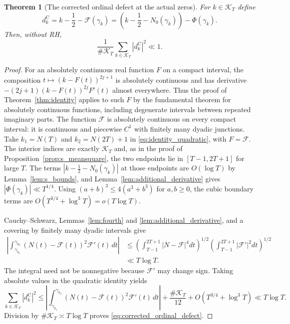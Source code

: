 \documentclass[11pt,a4paper]{article}
\makeatletter
\numberwithin{equation}{section}
\DeclareRobustCommand{\CGref}[1]{\ref{#1}}
\DeclareRobustCommand{\CGeqref}[1]{\eqref{#1}}
\let\CG@origref\ref
\let\CG@origeqref\eqref
\newcommand{\CG@gettip}[1]{\@ifundefined{CGTip@#1}{#1}{\csname CGTip@#1\endcsname}}
\DeclareRobustCommand{\CGref}[1]{\pdftooltip{\CG@origref{#1}}{\CG@gettip{#1}}}
\DeclareRobustCommand{\CGeqref}[1]{\pdftooltip{\CG@origeqref{#1}}{\CG@gettip{#1}}}
\newtheorem{theorem}{Theorem}[section]
\theoremstyle{definition}
\theoremstyle{remark}
\newcommand{\Nz}{N_0} %
\newcommand{\Fc}{\mathcal F}
\newcommand{\Ph}{\Phi}
\makeatother
\begin{document}
\begin{theorem}[The corrected ordinal defect at the actual zeros]\label{thm:corrected_ordinal_defect}
For $k\in\mathcal K_T$ define
\begin{equation}
 d_k^{\mathrm C}=k-\frac12-\Fc(\gamma_k)
 =\left(k-\frac12-\Nz(\gamma_k)\right)-\Ph(\gamma_k).
\label{eq:disp_43}
\end{equation}
Then, without RH,
\begin{equation}
\frac1{\#\mathcal K_T}\sum_{k\in\mathcal K_T}
|d_k^{\mathrm C}|^2\ll1.
\label{eq:corrected_ordinal_defect}
\end{equation}
\end{theorem}
\begin{proof}
For an absolutely continuous real function $F$ on a compact interval,
the composition $t\mapsto(k-F(t))^{2j+1}$ is absolutely continuous
and has derivative $-(2j+1)(k-F(t))^{2j}F'(t)$ almost everywhere.
Thus the proof of Theorem~\CGref{thm:identity} applies to such $F$
by the fundamental theorem for absolutely continuous functions,
including degenerate intervals between repeated imaginary parts.
The function $\Fc$ is absolutely continuous on every compact interval:
it is continuous and piecewise $C^1$ with finitely many dyadic junctions.
Take $k_1=N(T)$ and $k_2=N(2T)+1$ in
\CGeqref{eq:identity_quadratic}, with $F=\Fc$. The interior indices are
exactly $\mathcal K_T$ and, as in the proof of
Proposition~\CGref{prop:s_meansquare}, the two endpoints lie in
$[T-1,2T+1]$ for large $T$. The terms
$|k-\frac12-\Nz(\gamma_k)|$ at those endpoints are $O(\log T)$ by
Lemma~\CGref{lem:s_bounds}, and Lemma~\CGref{lem:additional_derivative}
gives $|\Ph(\gamma_k)|\ll T^{1/4}$.
Using $(a+b)^3\le4(a^3+b^3)$ for $a,b\ge0$, the cubic boundary terms are $O(T^{3/4}+\log^3T)=o(T\log T)$.

Cauchy--Schwarz, Lemmas~\CGref{lem:fourth} and
\CGref{lem:additional_derivative}, and a covering by finitely many dyadic
intervals give
\begin{equation}
\begin{aligned}
\left|\int_{\gamma_{k_1}}^{\gamma_{k_2}}
(N(t)-\Fc(t))^2\Fc'(t)\,dt\right|
&\le\left(\int_{T-1}^{2T+1}|N-\Fc|^4dt\right)^{1/2}
\left(\int_{T-1}^{2T+1}|\Fc'|^2dt\right)^{1/2}\\
&\ll T\log T.
\end{aligned}
\label{eq:disp_44}
\end{equation}
The integral need not be nonnegative because $\Fc'$ may change sign.
Taking absolute values in the quadratic identity yields
\begin{equation}
\sum_{k\in\mathcal K_T}|d_k^{\mathrm C}|^2
\le\left|\int_{\gamma_{k_1}}^{\gamma_{k_2}}
(N(t)-\Fc(t))^2\Fc'(t)\,dt\right|
+\frac{\#\mathcal K_T}{12}+O(T^{3/4}+\log^3T)
\ll T\log T.
\label{eq:disp_45}
\end{equation}
Division by $\#\mathcal K_T\asymp T\log T$ proves
\CGeqref{eq:corrected_ordinal_defect}.
\end{proof}
\end{document}
